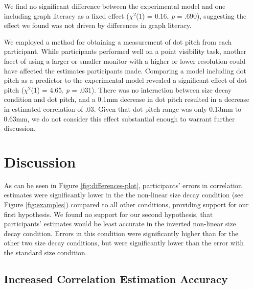 \documentclass{vgtc}                          %
\begin{document}
We find no significant difference between the experimental model
and one including graph literacy as a fixed effect
(\(\chi^2\)(1) =
0.16, \emph{p}
= .690),
suggesting the effect we found was not driven by differences in graph literacy.

We employed a method for obtaining a measurement of dot pitch from each participant.
While participants performed well on a point visibility task,
another facet of using a larger or smaller
monitor with a higher or lower resolution could have affected the estimates
participants made. Comparing a model including dot pitch as a predictor to the experimental model revealed
a significant effect of dot pitch (\(\chi^2\)(1)
= 4.65, \emph{p} = .031).
There was no interaction between size decay condition and dot pitch, and a 0.1mm decrease in dot
pitch resulted in a decrease in estimated correlation of .03. Given
that dot pitch range was only 0.13mm to
0.63mm, we do not consider this effect substantial
enough to warrant further discussion.

\hypertarget{discussion}{%
\section{Discussion}\label{discussion}}

As can be seen in Figure \ref{fig:differences-plot},
participants' errors in correlation estimates were significantly lower in the
the non-linear size decay condition (see Figure \ref{fig:examples})
compared to all other conditions, providing support for our
first hypothesis. We found no support for our second hypothesis, that participants'
estimates would be least accurate in the inverted non-linear size decay condition.
Errors in this condition were significantly higher than for the other two
size decay conditions, but were significantly lower than
the error with the standard size condition.

\hypertarget{increased-correlation-estimation-accuracy}{%
\subsection{Increased Correlation Estimation Accuracy}\label{increased-correlation-estimation-accuracy}}
\end{document}
